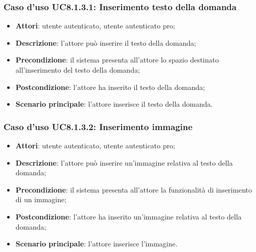 \subsubsection{Caso d'uso UC8.1.3.1: Inserimento testo della domanda}
	\begin{itemize}
		\item
			\textbf{Attori}: utente autenticato, utente autenticato pro;
		\item		
			\textbf{Descrizione}: l'attore può inserire il testo della domanda;
		\item
			\textbf{Precondizione}: il sistema presenta all'attore lo spazio destinato all'inserimento del testo della domanda;
		\item
			\textbf{Postcondizione}: l'attore ha inserito il testo della domanda;
		\item
			\textbf{Scenario principale}: l'attore inserisce il testo della domanda. 
	 			
	\end{itemize}
	
\subsubsection{Caso d'uso UC8.1.3.2: Inserimento immagine}
	\begin{itemize}
		\item
			\textbf{Attori}: utente autenticato, utente autenticato pro;
		\item		
			\textbf{Descrizione}: l'attore può inserire un'immagine relativa al testo della domanda;
		\item
			\textbf{Precondizione}: il sistema presenta all'attore la funzionalità di inserimento di un immagine; 
		\item
			\textbf{Postcondizione}: l'attore ha inserito un'immagine relativa al testo della domanda;
		\item
			\textbf{Scenario principale}: l'attore inserisce l'immagine.						
	\end{itemize}


	
